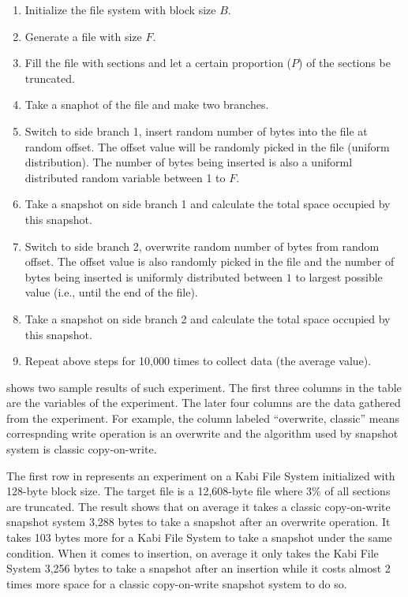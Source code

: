 \begin{enumerate}
	\item Initialize the file system with block size $B$.

	\item Generate a file with size $F$.

	\item Fill the file with sections and let a certain proportion ($P$) of the sections be truncated.

	\item Take a snaphot of the file and make two branches.
	
	\item Switch to side branch 1, insert random number of bytes into the file at random offset. The offset value will be randomly picked in the file (uniform distribution). The number of bytes being inserted is also a uniforml distributed random variable between 1 to $F$.

	\item Take a snapshot on side branch 1 and calculate the total space occupied by this snapshot.

	\item Switch to side branch 2, overwrite random number of bytes from random offset. The offset value is also randomly picked in the file and the number of bytes being inserted is uniformly distributed between $1$ to largest possible value (i.e., until the end of the file).

	\item Take a snapshot on side branch 2 and calculate the total space occupied by this snapshot.

	\item Repeat above steps for 10,000 times to collect data (the average value).
\end{enumerate}

     shows two sample results of such experiment. The first three columns in the table are the variables of the experiment. The later four columns are the data gathered from the experiment. For example, the column labeled ``overwrite, classic'' means correspnding write operation is an overwrite and the algorithm used by snapshot system is classic copy-on-write.

    The first row in  represents an experiment on a Kabi File System initialized with 128-byte block size. The target file is a 12,608-byte file where 3\% of all sections are truncated. The result shows that on average it takes a classic copy-on-write snapshot system 3,288 bytes to take a snapshot after an overwrite operation. It takes 103 bytes more for a Kabi File System to take a snapshot under the same condition. When it comes to insertion, on average it only takes the Kabi File System 3,256 bytes to take a snapshot after an insertion while it costs almost 2 times more space for a classic copy-on-write snapshot system to do so.

